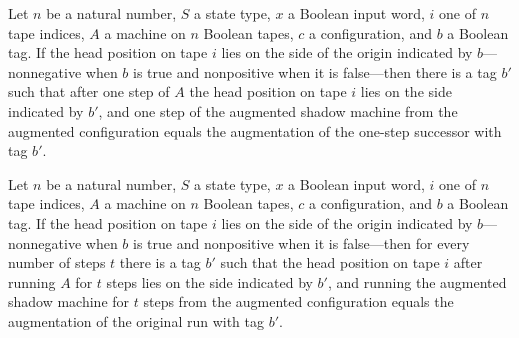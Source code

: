 \begin{theorem}
\label{Turing.oracleShadow_step}
\leanok
{}
Let $n$ be a natural number, $S$ a state type, $x$ a Boolean input word, $i$ one of $n$
tape indices, $A$ a machine on $n$ Boolean tapes, $c$ a configuration, and $b$ a Boolean
tag. If the head position on tape $i$ lies on the side of the origin indicated by
$b$—nonnegative when $b$ is true and nonpositive when it is false—then there is a tag
$b'$ such that after one step of $A$ the head position on tape $i$ lies on the side
indicated by $b'$, and one step of the augmented shadow machine from the augmented
configuration equals the augmentation of the one-step successor with tag $b'$.
\end{theorem}

\begin{theorem}
\label{Turing.oracleShadow_run}
\leanok
{}
Let $n$ be a natural number, $S$ a state type, $x$ a Boolean input word, $i$ one of $n$
tape indices, $A$ a machine on $n$ Boolean tapes, $c$ a configuration, and $b$ a Boolean
tag. If the head position on tape $i$ lies on the side of the origin indicated by
$b$—nonnegative when $b$ is true and nonpositive when it is false—then for every number
of steps $t$ there is a tag $b'$ such that the head position on tape $i$ after running
$A$ for $t$ steps lies on the side indicated by $b'$, and running the augmented shadow
machine for $t$ steps from the augmented configuration equals the augmentation of the
original run with tag $b'$.
\end{theorem}

